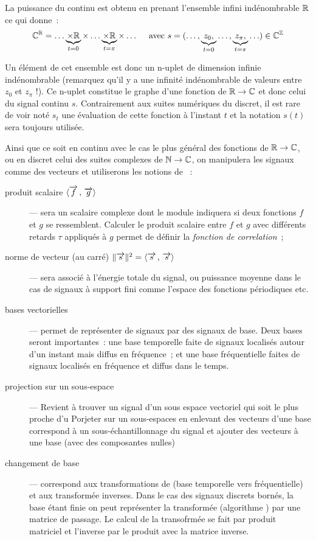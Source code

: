 \begin{remarque}
  
  La puissance du continu est obtenu en prenant l'ensemble infini
  indénombrable $\mathbb{R}$ ce qui donne~:
  $$ \mathbb{C}^{\mathbb{R}} = \ldots \underbrace{\times\mathbb{R}}_{t=0} \times \ldots \underbrace{\times\mathbb{R}}_{t=\pi} \times \ldots \quad\text{ avec } s=(\ldots, \underbrace{z_0, }_{t=0} \ldots, \underbrace{z_\pi, }_{t=\pi} \ldots) \in  \mathbb{C}^{\mathbb{Z}}$$

  Un élément de cet ensemble est donc un n-uplet de dimension infinie
  indénombrable (remarquez qu'il y a une infinité indénombrable de
  valeurs entre $z_0$ et $ z_\pi$ !). Ce n-uplet constitue le graphe
  d'une fonction de $\mathbb{R}\to\mathbb{C}$ et donc celui du signal continu
  $s$. Contrairement aux suites numériques du discret, il est rare de
  voir noté $s_t$ une évaluation de cette fonction à l'instant $t$ et
  la notation $s(t)$ sera toujours utilisée.
\end{remarque}


Ainsi que ce soit en continu avec le cas le plus général des fonctions
de $\mathbb{R}\to\mathbb{C}$, ou en discret celui des suites complexes de $\mathbb{N}\to\mathbb{C}$,
on manipulera les signaux comme des vecteurs et utiliserons les
notions de ~:
 \begin{description}
 \item[produit scalaire $\langle\overrightarrow{f}\,,\,\overrightarrow{g}\rangle$]--- sera un scalaire
   complexe dont le module indiquera si deux fonctions $f$ et $g$ se
   ressemblent. Calculer le produit scalaire entre $f$ et $g$ avec
   différents retards $\tau$ appliqués à $g$ permet de définir la
   \emph{fonction de correlation}~;
 \item[norme de vecteur (au carré)
   $\|\overrightarrow{s}\|^2=\langle\overrightarrow{s}\,,\,\overrightarrow{s}\rangle$]--- sera associé à l'énergie
   totale du signal, ou puissance moyenne dans le cas de signaux à
   support fini comme l'espace des fonctions périodiques etc.
 \item[bases vectorielles]--- permet de représenter de
   signaux par des signaux de base. Deux bases seront importantes~:
   une base temporelle faite de signaux localisés autour d'un instant
   mais diffus en fréquence~; et une base fréquentielle faites de
   signaux localisés en fréquence et diffus dans le temps.
 \item[projection sur un sous-espace]--- Revient à trouver un signal
   d'un sous espace vectoriel qui soit le plus proche d'u Porjeter sur
   un sous-espaces en enlevant des vecteurs d'une base correspond à un
   sous-échantillonnage du signal et ajouter des vecteurs à une base
   (avec des composantes nulles)
 \item[changement de base]--- correspond aux transformations de
   \Fourier{} (base temporelle vers fréquentielle) et aux transformée
   inverses. Dans le cas des signaux discrets bornés, la base étant
   finie on peut représenter la transformée \TFD{} (algorithme \FFT)
   par une matrice de passage. Le calcul de la transofrmée se fait par
   produit matriciel et l'inverse par le produit avec la matrice
   inverse.
\end{description}
 
